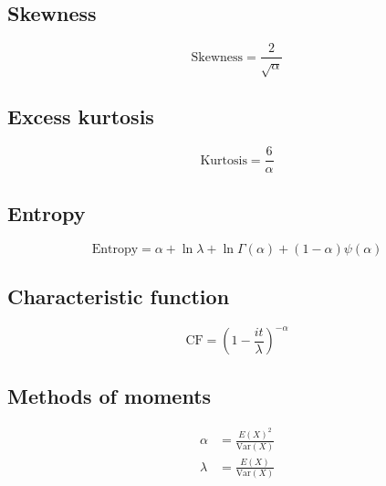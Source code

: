 \documentclass[12pt]{article}
\begin{document}
\subsection{Skewness}
\begin{equation}\label{eq:gamma-skewness-2}
	\text{Skewness} = \frac{2}{\sqrt{\alpha}}
\end{equation}

\subsection{Excess kurtosis}
\begin{equation}\label{eq:gamma-kurtosis-2}
	\text{Kurtosis} = \frac{6}{\alpha}
\end{equation}

\subsection{Entropy}
\begin{equation}\label{eq:gamma-entropy-2}
	\text{Entropy} = \alpha + \ln{\lambda} + \ln{\Gamma(\alpha)} + (1-\alpha)\psi(\alpha)
\end{equation}

\subsection{Characteristic function}
\begin{equation}\label{eq:gamma-cf-2}
	\text{CF} = \left(1-\frac{it}{\lambda}\right)^{-\alpha}
\end{equation}

\subsection{Methods of moments}
\begin{equation}\label{eq:gamma-mom-2}
	\begin{split}
		\alpha	&=	\frac{E(X)^2}{\text{Var}(X)}\\
		\lambda	&=	\frac{E(X)}{\text{Var}(X)}
	\end{split}
\end{equation}

\end{document}
